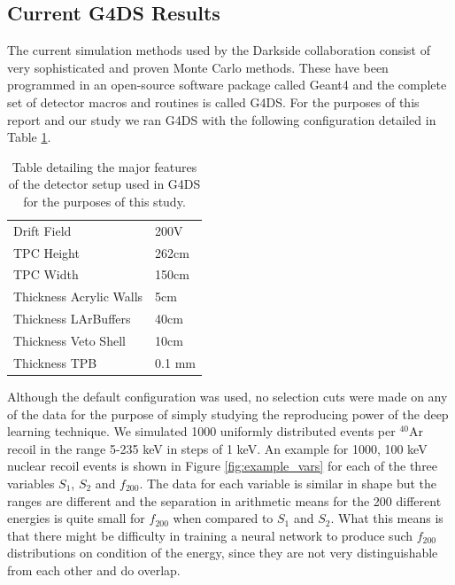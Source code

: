 \documentclass[11pt]{article} %
\begin{document}
\subsection{Current G4DS Results}
The current simulation methods used by the Darkside collaboration consist of very sophisticated and proven Monte Carlo methods.
These have been programmed in an open-source software package called Geant4 \cite{G4} and the complete set of detector macros and routines is called G4DS.
For the purposes of this report and our study we ran G4DS with the following configuration detailed in Table \ref{table:g4ds_config}.
\begin{table}[!h]
\centering
\begin{tabular}{l|l}
\hline
Drift Field & 200V \\
TPC Height & 262cm \\
TPC Width & 150cm \\
Thickness Acrylic Walls & 5cm \\
Thickness LArBuffers & 40cm \\
Thickness Veto Shell & 10cm \\
Thickness TPB & 0.1 mm \\
\hline
\end{tabular}
\caption{Table detailing the major features of the detector setup used in G4DS for the purposes of this study.}
\label{table:g4ds_config}
\end{table}
Although the default configuration was used, no selection cuts were made on any of the data for the purpose of simply studying the reproducing power of the deep learning technique.
We simulated 1000 uniformly distributed events per $^{40}\mathrm{\text{Ar}}$ recoil in the range 5-235 keV in steps of 1 keV.
An example for 1000, 100 keV nuclear recoil events is shown in Figure \ref{fig:example_vars} for each of the three variables $S_1$, $S_2$ and $f_{200}$.
The data for each variable is similar in shape but the ranges are different and the separation in arithmetic means for the 200 different energies is quite small for $f_{200}$
when compared to $S_1$ and $S_2$.
What this means is that there might be difficulty in training a neural network to produce such $f_{200}$ distributions on condition of the energy, since they are not very distinguishable from each other and do overlap.
\end{document}
